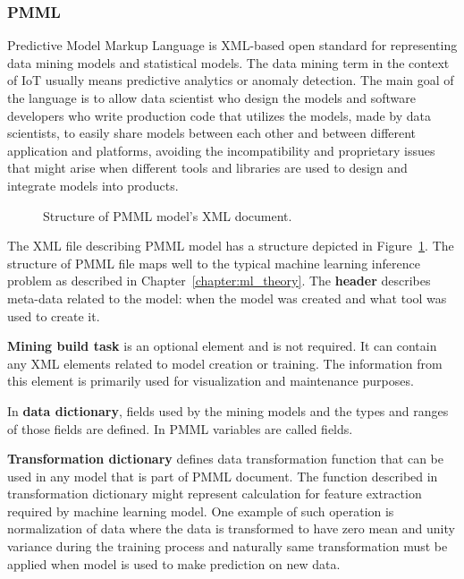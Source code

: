 \documentclass[english, 12pt, a4paper, elec, utf8, online]{aaltothesis}
\begin{document}
\subsubsection{PMML}
Predictive Model Markup Language is XML-based open standard for representing data mining models and statistical models. The data mining term in the context of IoT usually means predictive analytics or anomaly detection. The main goal of the language is to allow data scientist who design the models and software developers who write production code that utilizes the models, made by data scientists, to easily share models between each other and between different application and platforms, avoiding the incompatibility and proprietary issues that might arise when different tools and libraries are used to design and integrate models into products.~\cite{guazzelli2009pmml}

\begin{figure}[h!]
\centering
{}
\caption{Structure of PMML model's XML document.}\label{fig:pmml_struct}
\end{figure}

The XML file describing PMML model has a structure depicted in Figure~\ref{fig:pmml_struct}. The structure of PMML file maps well to the typical machine learning inference problem as described in Chapter~\ref{chapter:ml_theory}. The \textbf{header} describes meta-data related to the model: when the model was created and what tool was used to create it. 

\textbf{Mining build task} is an optional element and is not required. It can contain any XML elements related to model creation or training. The information from this element is primarily used for visualization and maintenance purposes.

In \textbf{data dictionary}, fields used by the mining models and the types and ranges of those fields are defined. In PMML variables are called fields.

\textbf{Transformation dictionary} defines data transformation function that can be used in any model that is part of PMML document. The function described in transformation dictionary might represent calculation for feature extraction required by machine learning model. One example of such operation is normalization of data where the data is transformed to have zero mean and unity variance during the training process and naturally same transformation must be applied when model is used to make prediction on new data.
\end{document}
